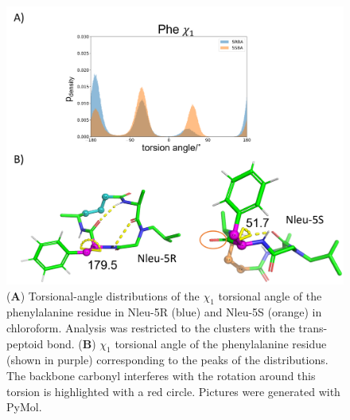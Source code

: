 \begin{figure}[h!]
    \centering
    \includegraphics[width=\textwidth]{7_chapter_5/fig/results/dihedral_dist_subs.png}
    \caption{(\textbf{A}) Torsional-angle distributions of the $\chi_1$ torsional angle of the phenylalanine residue in Nleu-5R (blue) and Nleu-5S (orange) in chloroform. Analysis was restricted to the clusters with the trans-peptoid bond. (\textbf{B}) $\chi_1$ torsional angle of the phenylalanine residue (shown in purple) corresponding to the peaks of the distributions. The backbone carbonyl interferes with the rotation around this torsion is highlighted with a red circle. Pictures were generated with PyMol. \cite{Delano2020}}
    \label{fig: dihedralDistSubst}
\end{figure}

